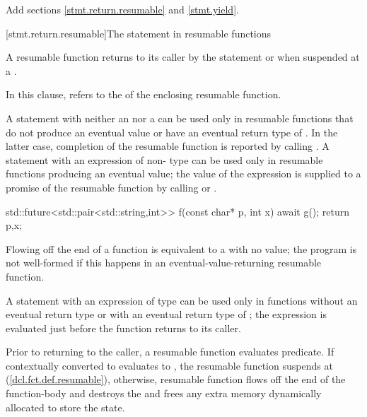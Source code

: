 Add sections \ref{stmt.return.resumable} and \ref{stmt.yield}.

[stmt.return.resumable]{The  statement in resumable functions}%

\pnum
A resumable function returns to its caller by the  statement
or when suspended at a .

\pnum
  In this clause,  refers to the 
  of the enclosing resumable function.
  
\pnum
A  statement
with neither an  nor a 
can be used only in resumable functions
that do not produce an eventual value or have an eventual return type of . In the latter case, completion of the resumable function
is reported by calling .
A  statement with an expression of non- type can be used only
in resumable functions producing an eventual value; the value of the expression is supplied to a promise of the resumable function by calling 
 or
.

\enterexample

\begin{codeblock}
  std::future<std::pair<std::string,int>> f(const char* p, int x) {
    await g();
    return {p,x};
  }
\end{codeblock}
\exitexample

Flowing off the end of a function is equivalent to a  with
no value; the program is not well-formed if this happens in an eventual-value-returning resumable function.

\pnum
A  statement with an expression of type 
can be used only in functions without an eventual return type 
or with an eventual return type of ; the expression is evaluated just before the function
returns to its caller.

\pnum
Prior to returning to the caller, a resumable function evaluates
 predicate. If  contextually converted to  evaluates to
, the resumable function suspends at  (\ref{dcl.fct.def.resumable}),
otherwise, resumable function flows off the end of the function-body and destroys the  and frees any extra memory dynamically allocated to store the state.

